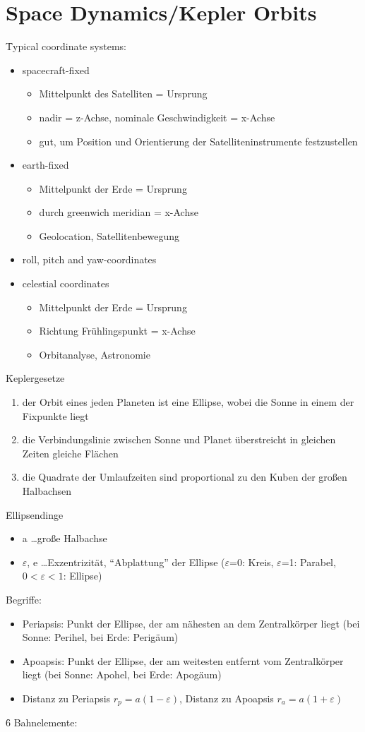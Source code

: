 \section{Space Dynamics/Kepler Orbits}
\f{Typical coordinate systems:}
\begin{itemize}
 \item spacecraft-fixed
 \begin{itemize}
  \item Mittelpunkt des Satelliten = Ursprung
  \item nadir = z-Achse, nominale Geschwindigkeit = x-Achse
  \item gut, um Position und Orientierung der Satelliteninstrumente festzustellen
 \end{itemize}
 \item earth-fixed 
 \begin{itemize}
  \item Mittelpunkt der Erde = Ursprung
  \item durch greenwich meridian = x-Achse
  \item Geolocation, Satellitenbewegung
 \end{itemize}
 \item roll, pitch and yaw-coordinates 
 \item celestial coordinates
 \begin{itemize}
  \item Mittelpunkt der Erde = Ursprung
  \item Richtung Frühlingspunkt = x-Achse
  \item Orbitanalyse, Astronomie
 \end{itemize}
\end{itemize}
\f{Keplergesetze}
\begin{enumerate}
 \item der Orbit eines jeden Planeten ist eine Ellipse, wobei die Sonne in einem der Fixpunkte liegt
 \item die Verbindungslinie zwischen Sonne und Planet überstreicht in gleichen Zeiten gleiche Flächen 
 \item die Quadrate der Umlaufzeiten sind proportional zu den Kuben der großen Halbachsen
\end{enumerate}
\f{Ellipsendinge}
\begin{itemize}
 \item a \dots große Halbachse
 \item $\varepsilon$, e \dots Exzentrizität, ``Abplattung'' der Ellipse ($\varepsilon$=0: Kreis, $\varepsilon$=1: Parabel, $0<\varepsilon<1$: Ellipse)
\end{itemize}
\f{Begriffe: }
\begin{itemize}
 \item Periapsis: Punkt der Ellipse, der am nähesten an dem Zentralkörper liegt (bei Sonne: Perihel, bei Erde: Perigäum)
 \item Apoapsis: Punkt der Ellipse, der am weitesten entfernt vom Zentralkörper liegt (bei Sonne: Apohel, bei Erde: Apogäum)
 \item Distanz zu Periapsis $r_p = a(1-\varepsilon)$, Distanz zu Apoapsis $r_a = a(1+\varepsilon)$
\end{itemize}
\f{6 Bahnelemente:}
\vspace*{10pt}

